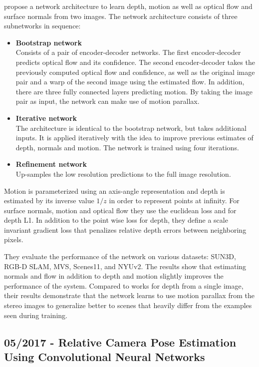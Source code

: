 		\cite{ummenhofer2016demon} propose a network architecture to learn depth, motion as well as optical flow and surface normals from two images.
		The network architecture consists of three subnetworks in sequence:
		\begin{itemize}
			\item \textbf{Bootstrap network}
				\\
				Consists of a pair of encoder-decoder networks.
				The first encoder-decoder predicts optical flow and its confidence.
				The second encoder-decoder takes the previously computed optical flow and confidence, as well as the original image pair and a warp of the second image using the estimated flow.
				In addition, there are three fully connected layers predicting motion.
				By taking the image pair as input, the network can make use of motion parallax.
			\item \textbf{Iterative network}
				\\
				The architecture is identical to the bootstrap network, but takes additional inputs.
				It is applied iteratively with the idea to improve previous estimates of depth, normals and motion.
				The network is trained using four iterations.
			\item \textbf{Refinement network}
				\\
				Up-samples the low resolution predictions to the full image resolution.
		\end{itemize}
		Motion is parameterized using an axis-angle representation and depth is estimated by its inverse value $1 / z$ in order to represent points at infinity.
		For surface normals, motion and optical flow they use the euclidean loss and for depth L1.
		In addition to the point wise loss for depth, they define a scale invariant gradient loss that penalizes relative depth errors between neighboring pixels.
		
		They evaluate the performance of the network on various datasets: {SUN3D}, {RGB-D SLAM}, {MVS}, {Scenes11}, and {NYUv2}.
		The results show that estimating normals and flow in addition to depth and motion slightly improves the performance of the system.
		Compared to works for depth from a single image, their results demonstrate that the network learns to use motion parallax from the stereo images to generalize better to scenes that heavily differ from the examples seen during training.
		
	\subsection{05/2017 - Relative Camera Pose Estimation Using Convolutional Neural Networks}
	
